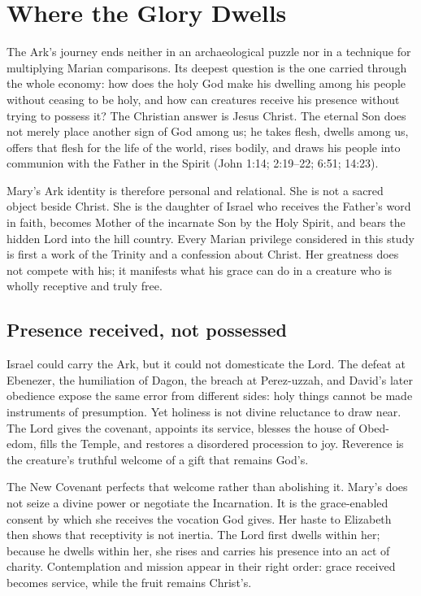 \section{Where the Glory Dwells}

The Ark's journey ends neither in an archaeological puzzle nor in a technique
for multiplying Marian comparisons.  Its deepest question is the one carried
through the whole economy: how does the holy God make his dwelling among his
people without ceasing to be holy, and how can creatures receive his presence
without trying to possess it?  The Christian answer is Jesus Christ.  The
eternal Son does not merely place another sign of God among us; he takes flesh,
dwells among us, offers that flesh for the life of the world, rises bodily, and
draws his people into communion with the Father in the Spirit (John 1:14;
2:19--22; 6:51; 14:23).

Mary's Ark identity is therefore personal and relational.  She is not a sacred
object beside Christ.  She is the daughter of Israel who receives the Father's
word in faith, becomes Mother of the incarnate Son by the Holy Spirit, and
bears the hidden Lord into the hill country.  Every Marian privilege considered
in this study is first a work of the Trinity and a confession about Christ.
Her greatness does not compete with his; it manifests what his grace can do in
a creature who is wholly receptive and truly free.

\subsection{Presence received, not possessed}

Israel could carry the Ark, but it could not domesticate the Lord.  The defeat
at Ebenezer, the humiliation of Dagon, the breach at Perez-uzzah, and David's
later obedience expose the same error from different sides: holy things cannot
be made instruments of presumption.  Yet holiness is not divine reluctance to
draw near.  The Lord gives the covenant, appoints its service, blesses the
house of Obed-edom, fills the Temple, and restores a disordered procession to
joy.  Reverence is the creature's truthful welcome of a gift that remains
God's.

The New Covenant perfects that welcome rather than abolishing it.  Mary's
 does not seize a divine power or negotiate the Incarnation.  It is
the grace-enabled consent by which she receives the vocation God gives.  Her
haste to Elizabeth then shows that receptivity is not inertia.  The Lord first
dwells within her; because he dwells within her, she rises and carries his
presence into an act of charity.  Contemplation and mission appear in their
right order: grace received becomes service, while the fruit remains Christ's.

